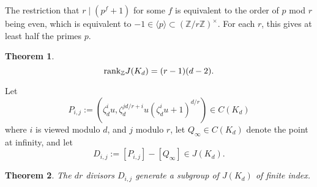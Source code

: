 \documentclass[reqno]{amsart}
\newtheorem{thm}{Theorem}[section]
\theoremstyle{definition}
\theoremstyle{remark}
\def\Gal{\textrm{\upshape Gal}}
\def\Z{\mathbb{Z}}
\def\rank{\textnormal{rank}}
\begin{document}
The restriction that $r \mid (p^f+1)$ for some $f$ is 
equivalent to the order of $p$ mod $r$ being even, which is
equivalent to $-1 \in \langle p \rangle \subset (\Z/r\Z)^\times$. 
For each $r$, this gives at least half the primes $p$. 




\begin{thm}
\label{rkthm}
\[
\rank_\Z J(K_d) = (r-1)(d-2).
\]
\end{thm}


Let  %
\[
P_{i,j} := (\zeta_d^i u, \zeta_d^{jd/r + i}u(\zeta_d^i u+1)^{d/r}) \in C(K_d)
\]
where $i$ is viewed modulo $d$, and $j$ modulo $r$, %
let $Q_\infty \in C(K_d)$ denote the point at infinity,
and let
\[
D_{i,j} := [P_{i,j}] - [Q_\infty] \in J(K_d).
\]

\begin{thm}
\label{Dijgenthm}
The $dr$ divisors $D_{i,j}$ generate a subgroup of $J(K_d)$ of finite index.
\end{thm}
\end{document}
